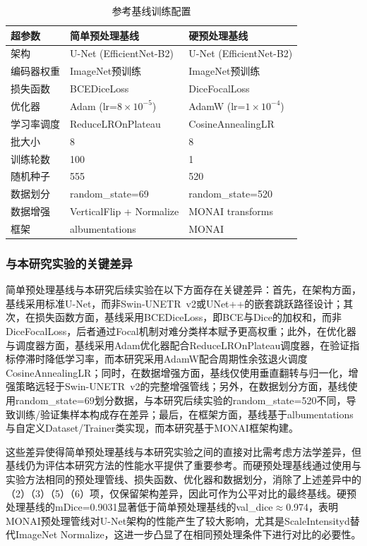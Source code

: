 \documentclass[12pt, a4paper]{article}
\begin{document}
\begin{table}[H]
    \centering
    \caption{参考基线训练配置}
    \label{tab:baseline_config}
    \begin{tabular}{@{}lll@{}}
        \toprule
        \textbf{超参数} & \textbf{简单预处理基线} & \textbf{硬预处理基线} \\
        \midrule
        架构 & U-Net (EfficientNet-B2) & U-Net (EfficientNet-B2) \\
        编码器权重 & ImageNet预训练 & ImageNet预训练 \\
        损失函数 & BCEDiceLoss & DiceFocalLoss \\
        优化器 & Adam (lr=$8{\times}10^{-5}$) & AdamW (lr=$1{\times}10^{-4}$) \\
        学习率调度 & ReduceLROnPlateau & CosineAnnealingLR \\
        批大小 & 8 & 8 \\
        训练轮数 & 100 & 1 \\
        随机种子 & 555 & 520 \\
        数据划分 & random\_state=69 & random\_state=520 \\
        数据增强 & VerticalFlip + Normalize & MONAI transforms \\
        框架 & albumentations & MONAI \\
        \bottomrule
    \end{tabular}
\end{table}

\subsubsection{与本研究实验的关键差异}

简单预处理基线与本研究后续实验在以下方面存在关键差异：首先，在架构方面，基线采用标准U-Net，而非Swin-UNETR~v2或UNet++的嵌套跳跃路径设计；其次，在损失函数方面，基线采用BCEDiceLoss，即BCE与Dice的加权和，而非DiceFocalLoss，后者通过Focal机制对难分类样本赋予更高权重；此外，在优化器与调度器方面，基线采用Adam优化器配合ReduceLROnPlateau调度器，在验证指标停滞时降低学习率，而本研究采用AdamW配合周期性余弦退火调度CosineAnnealingLR；同时，在数据增强方面，基线仅使用垂直翻转与归一化，增强策略远轻于Swin-UNETR~v2的完整增强管线；另外，在数据划分方面，基线使用random\_state=69划分数据，与本研究后续实验的random\_state=520不同，导致训练/验证集样本构成存在差异；最后，在框架方面，基线基于albumentations与自定义Dataset/Trainer类实现，而本研究基于MONAI框架构建。

这些差异使得简单预处理基线与本研究实验之间的直接对比需考虑方法学差异，但基线仍为评估本研究方法的性能水平提供了重要参考。而硬预处理基线通过使用与实验方法相同的预处理管线、损失函数、优化器和数据划分，消除了上述差异中的（2）（3）（5）（6）项，仅保留架构差异，因此可作为公平对比的最终基线。硬预处理基线的mDice=0.9031显著低于简单预处理基线的val\_dice$\approx$0.974，表明MONAI预处理管线对U-Net架构的性能产生了较大影响，尤其是ScaleIntensityd替代ImageNet Normalize，这进一步凸显了在相同预处理条件下进行对比的必要性。
\end{document}
